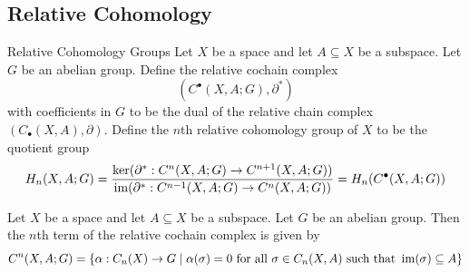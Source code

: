 \documentclass[a4paper]{article}
\begin{document}
\subsection{Relative Cohomology}
\begin{defn}{Relative Cohomology Groups}{} Let $X$ be a space and let $A\subseteq X$ be a subspace. Let $G$ be an abelian group. Define the relative cochain complex $$(C^\bullet(X,A;G),\partial^\ast)$$ with coefficients in $G$ to be the dual of the relative chain complex $(C_\bullet(X,A),\partial)$. Define the $n$th relative cohomology group of $X$ to be the quotient group $$H_n(X,A;G)=\frac{\ker(\partial^\ast:C^n(X,A;G)\to C^{n+1}(X,A;G))}{\operatorname{im}(\partial^\ast:C^{n-1}(X,A;G)\to C^n(X,A;G))}=H_n(C^\bullet(X,A;G))$$
\end{defn}

\begin{lmm}{}{} Let $X$ be a space and let $A\subseteq X$ be a subspace. Let $G$ be an abelian group. Then the $n$th term of the relative cochain complex is given by $$C^n(X,A;G)=\{\alpha:C_n(X)\to G\;|\;\alpha(\sigma)=0\text{ for all }\sigma\in C_n(X,A)\text{ such that }\operatorname{im}(\sigma)\subseteq A\}$$
\end{lmm}
\end{document}
